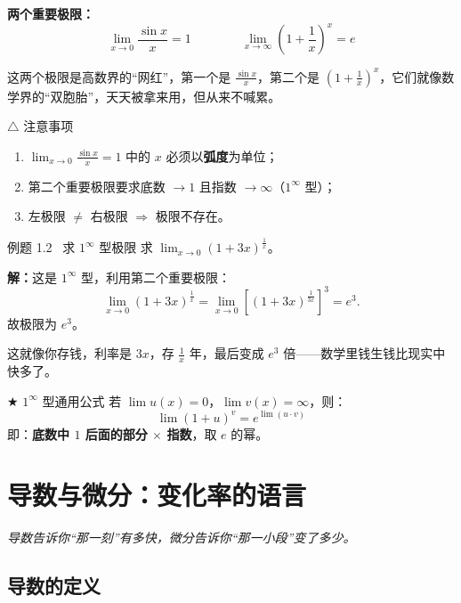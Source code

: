 \documentclass[12pt,a4paper]{article}
\newcommand{\redtext}[1]{{\color{MainRed}\textbf{#1}}}
\newcommand{\greentext}[1]{{\color{MintGreen}\textbf{#1}}}
\newcommand{\humor}[1]{\par\smallskip\begin{humorbox}#1\end{humorbox}\smallskip}
\begin{document}
\begin{formulaframe}
\centering
\textbf{两个重要极限：}
\[
\lim_{x \to 0} \frac{\sin x}{x} = 1 \qquad\qquad \lim_{x \to \infty}\left(1+\frac{1}{x}\right)^x = e
\]
\end{formulaframe}
\humor{这两个极限是高数界的“网红”，第一个是 $\frac{\sin x}{x}$，第二个是 $(1+\frac{1}{x})^x$，它们就像数学界的“双胞胎”，天天被拿来用，但从来不喊累。}

\begin{warnbox}{$\triangle$ 注意事项}
\begin{enumerate}[leftmargin=2em, itemsep=3pt]
  \item $\displaystyle\lim_{x \to 0}\frac{\sin x}{x} = 1$ 中的 $x$ 必须以\redtext{弧度}为单位；
  \item 第二个重要极限要求底数 $\to 1$ 且指数 $\to \infty$（$1^\infty$ 型）；
  \item 左极限 $\neq$ 右极限 $\Rightarrow$ 极限不存在。
\end{enumerate}
\end{warnbox}

\begin{exbox}{例题 1.2 \ 求 $1^\infty$ 型极限}
求 $\displaystyle\lim_{x \to 0}(1 + 3x)^{\frac{1}{x}}$。

\sffamily\textbf{解：}\normalfont 这是 $1^\infty$ 型，利用第二个重要极限：
\[
\lim_{x \to 0}(1+3x)^{\frac{1}{x}} = \lim_{x \to 0}\left[(1+3x)^{\frac{1}{3x}}\right]^{3} = e^3.
\]
故极限为 $\boxed{e^3}$。
\end{exbox}
\humor{这就像你存钱，利率是 $3x$，存 $\frac{1}{x}$ 年，最后变成 $e^3$ 倍——数学里钱生钱比现实中快多了。}

\begin{tipbox}{$\bigstar$ $1^\infty$ 型通用公式}
若 $\lim u(x) = 0$，$\lim v(x) = \infty$，则：
\[
\lim (1+u)^v = e^{\lim(u \cdot v)}
\]
即：\greentext{底数中 $1$ 后面的部分 $\times$ 指数}，取 $e$ 的幂。
\end{tipbox}

\newpage
\section{导数与微分：变化率的语言}
\begin{center}\textcolor{Sunshine}{\itshape 导数告诉你“那一刻”有多快，微分告诉你“那一小段”变了多少。}\end{center}

\subsection{导数的定义}
\end{document}
